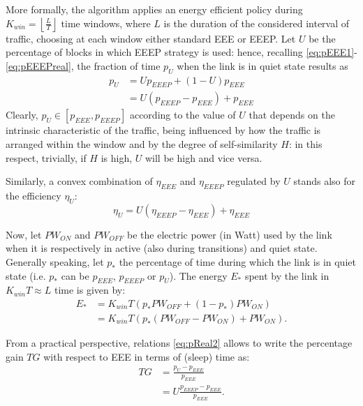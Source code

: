 \documentclass[journal,10pt,twoside,final]{IEEEtran}
\begin{document}
More formally, the algorithm applies an energy efficient policy during $K_{win}= \left \lfloor{\frac{L}{T}}\right \rfloor $ time windows, where $L$ is the duration of the considered interval of traffic, choosing at each window either standard EEE or EEEP. Let $U$ be the percentage of blocks in which EEEP strategy is used: hence, recalling \eqref{eq:pEEE1}-\eqref{eq:pEEEPreal}, the fraction of time $p_U$ when the link is in quiet state results as
\begin{align}
p_U &=U p_{EEEP} + (1 - U) p_{EEE} \\
                  &= U (p_{EEEP} - p_{EEE})  + p_{EEE}
                  \label{eq:pReal2}
\end{align}
Clearly, $p_U\in \left[ p_{EEE}, p_{EEEP}\right]$ according to the value of $U$ that depends on the intrinsic characteristic of the traffic, being influenced by how the traffic is arranged within the window and by the degree of self-similarity $H$: in this respect, trivially, if $H$ is high, $U$ will be high and vice versa.
 
Similarly, a convex combination of $\eta_{EEE}$ and $\eta_{EEEP}$ regulated by $U$ stands also for the efficiency $\eta_U$:
\begin{equation}
\eta_U =  U(\eta_{EEEP} - \eta_{EEE}) + \eta_{EEE}
                  \label{eq:etaReal2}
\end{equation}
 
Now, let $PW_{ON}$ and $PW_{OFF}$ be the electric power (in Watt) used by the link when it is respectively in active (also during transitions) and quiet state. Generally speaking, let $p_\ast$ the percentage of time during which the link is in quiet state (i.e. $p_\ast$ can be $p_{EEE}$, $p_{EEEP}$ or $p_U$). The energy $E_\ast$ spent by the link in $K_{win}T\approx L$ time is given by:
\begin{align}
E_\ast &= K_{win}T \left(p_\ast PW_{OFF} + \left(1 - p_\ast\right) PW_{ON}\right)\\ 
  &= K_{win}T \left ( p_\ast \left(PW_{OFF} - PW_{ON}\right) + PW_{ON} \right).
  \label{eq:energy}
\end{align}  

From a practical perspective, relations \eqref{eq:pReal2} allows to write the percentage gain $TG$ with respect to EEE in terms of (sleep) time as:
\begin{align}
TG & = \frac{p_U - p_{EEE}}{p_{EEE}} \label{eq:TG1}\\
      & = U \frac{p_{EEEP} - p_{EEE}}{p_{EEE}}.
\label{eq:TG}
\end{align}
\end{document}
